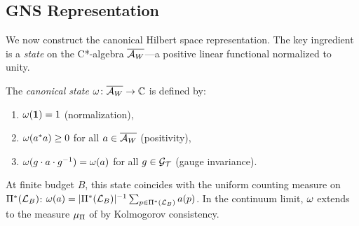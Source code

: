\subsection{GNS Representation}
\label{sec:context-born:gns}

We now construct the canonical Hilbert space representation.  The key
ingredient is a \emph{state} on the C*-algebra $\overline{\mathcal{A}_W}$---a positive
linear functional normalized to unity.

\begin{definition}
\label{def:gns-state}
The \emph{canonical state} $\omega \colon \overline{\mathcal{A}_W} \to \mathbb{C}$ is
defined by:
\begin{enumerate}[nosep, label=(\roman*)]
  \item $\omega(\mathbf{1}) = 1$ \quad (normalization),
  \item $\omega(a^* a) \geq 0$ for all $a \in \overline{\mathcal{A}_W}$ \quad (positivity),
  \item $\omega(g \cdot a \cdot g^{-1}) = \omega(a)$ for all
        $g \in \mathcal{G}_{\mathcal{T}}$ \quad (gauge invariance).
\end{enumerate}
At finite budget $B$, this state coincides with the uniform counting
measure on $\Pi^*(\mathcal{L}_B)$:
$\omega(a) = |\Pi^*(\mathcal{L}_B)|^{-1} \sum_{p \in \Pi^*(\mathcal{L}_B)} a(p)$.
In the continuum limit, $\omega$ extends to the measure $\mu_\Pi$ of
 by Kolmogorov consistency.
\end{definition}

